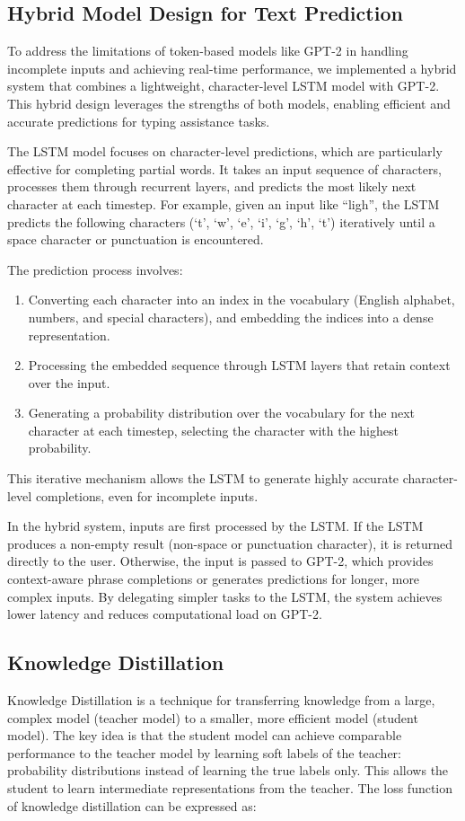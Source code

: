 \subsection{Hybrid Model Design for Text Prediction}\label{subsec:mt:hybrid-model-design}
To address the limitations of token-based models like GPT-2 in handling incomplete inputs and achieving real-time performance,
we implemented a hybrid system that combines a lightweight, character-level LSTM model with GPT-2.
This hybrid design leverages the strengths of both models, enabling efficient and accurate predictions for typing assistance tasks.

The LSTM model focuses on character-level predictions, which are particularly effective for completing partial words.
It takes an input sequence of characters, processes them through recurrent layers, and predicts the most likely next character at each timestep.
For example, given an input like ``ligh'', the LSTM predicts the following characters
(`t', `w', `e', `i', `g', `h', `t') iteratively until a space character or punctuation is encountered.

The prediction process involves:

\begin{enumerate}
\item Converting each character into an index in the vocabulary (English alphabet, numbers, and special characters), and embedding the indices into a dense representation.
\item Processing the embedded sequence through LSTM layers that retain context over the input.
\item Generating a probability distribution over the vocabulary for the next character at each timestep, selecting the character with the highest probability.
\end{enumerate}
This iterative mechanism allows the LSTM to generate highly accurate character-level completions, even for incomplete inputs.

In the hybrid system, inputs are first processed by the LSTM. If the LSTM produces a non-empty result (non-space or punctuation character), it is returned directly to the user.
Otherwise, the input is passed to GPT-2, which provides context-aware phrase completions or generates predictions for longer, more complex inputs.
By delegating simpler tasks to the LSTM, the system achieves lower latency and reduces computational load on GPT-2.

\subsection{Knowledge Distillation}
Knowledge Distillation is a technique for transferring knowledge from a large, complex model (teacher model) to a smaller,
more efficient model (student model).
The key idea is that the student model can achieve comparable performance to the teacher model by learning soft labels of the teacher:
probability distributions instead of learning the true labels only.
This allows the student to learn intermediate representations from the teacher.
The loss function of knowledge distillation can be expressed as:

